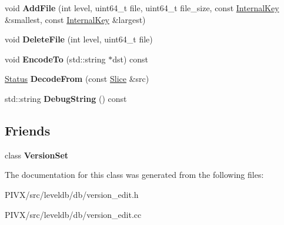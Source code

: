 \begin{DoxyCompactItemize}
void {\bfseries Add\+File} (int level, uint64\+\_\+t file, uint64\+\_\+t file\+\_\+size, const \mbox{\hyperlink{classleveldb_1_1_internal_key}{Internal\+Key}} \&smallest, const \mbox{\hyperlink{classleveldb_1_1_internal_key}{Internal\+Key}} \&largest)
\item 
\mbox{\label{classleveldb_1_1_version_edit_ac222bfd1055114d57aadbd124f24ad0c}} 
void {\bfseries Delete\+File} (int level, uint64\+\_\+t file)
\item 
\mbox{\label{classleveldb_1_1_version_edit_af95009ddc020f72a32a1aa805bcf3a91}} 
void {\bfseries Encode\+To} (std\+::string $\ast$dst) const
\item 
\mbox{\label{classleveldb_1_1_version_edit_ac0f431c5e8f08c74c697d8480f7c005f}} 
\mbox{\hyperlink{classleveldb_1_1_status}{Status}} {\bfseries Decode\+From} (const \mbox{\hyperlink{classleveldb_1_1_slice}{Slice}} \&src)
\item 
\mbox{\label{classleveldb_1_1_version_edit_a535f639edaa85da0d602b145528c6303}} 
std\+::string {\bfseries Debug\+String} () const
\end{DoxyCompactItemize}
\subsection*{Friends}
\begin{DoxyCompactItemize}
\item 
\mbox{\label{classleveldb_1_1_version_edit_a1827cd1b4d6e9e3c378ce37ca3cce635}} 
class {\bfseries Version\+Set}
\end{DoxyCompactItemize}


The documentation for this class was generated from the following files\+:\begin{DoxyCompactItemize}
\item 
P\+I\+V\+X/src/leveldb/db/version\+\_\+edit.\+h\item 
P\+I\+V\+X/src/leveldb/db/version\+\_\+edit.\+cc\end{DoxyCompactItemize}
